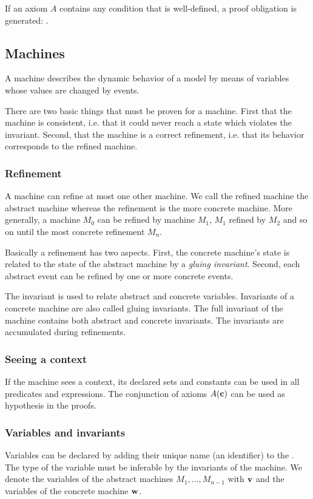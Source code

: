If an axiom $A$ contains any condition that is well-defined, a proof obligation is generated:
.


\subsection{Machines}
A machine describes the dynamic behavior of a model by means of variables whose values are changed by events.

There are two basic things that must be proven for a machine. First that the machine is
consistent, i.e. that it could never reach a state which violates the invariant. Second,
that the machine is a correct refinement, i.e. that its behavior corresponds to the
refined machine.

\subsubsection{Refinement}
A machine can refine at most one other machine. 
We call the refined machine the abstract machine whereas the refinement is the more concrete machine. 
More generally, a machine $M_0$ can be refined by machine $M_1$, $M_1$ refined by $M_2$ 
and so on until the most concrete refinement $M_n$. 

Basically a refinement has two aspects. First, the concrete machine's state is related to the state of the
abstract machine by a \emph{gluing invariant}. Second, each abstract event can be refined by one or more
concrete events.

The invariant is used to relate abstract and concrete variables. Invariants of a concrete machine are also called gluing invariants.
The full invariant of the machine contains both abstract and concrete invariants. 
The invariants are accumulated during refinements.

\subsubsection{Seeing a context}
If the machine sees a context, its declared sets and constants can be used in
 all predicates and expressions.
The conjunction of axioms $A(\textbf{c})$ can be used as hypothesis in the proofs.

\subsubsection{Variables and invariants}
Variables can be declared by adding their unique name (an identifier) to the .
The type of the variable must be inferable by the invariants of the machine.
We denote the variables of the abstract machines $M_1,\ldots,M_{n-1}$ with $\textbf{v}$ and
the variables of the concrete machine $\textbf{w}$.

